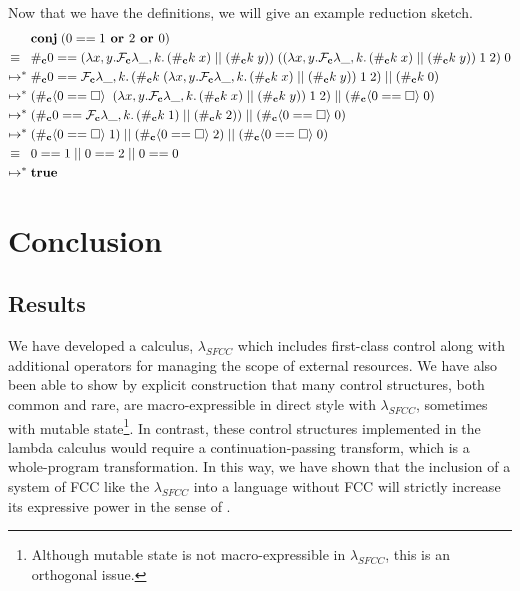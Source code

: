 \documentclass[11pt]{article}
\newcommand{\maybePage}{\newpage}
\newcommand\x{\lambda x}
\newcommand\F{\mathcal{F}}
\newcommand{\angles}[1]{\langle#1\rangle}
\begin{document}
Now that we have the definitions, we will give an example reduction sketch.
\begin{align*}
&\textbf{conj}\;(0 == 1\textbf{ or }2\textbf{ or }0) \\
\equiv{}\;\;& \#_\textbf c 0 ==
	(\x,y. \F_\textbf{c}\lambda \_, k.\,(\#_\textbf{c}k\;x)\;||\;(\#_\textbf{c}k\;y))
		\;((\x,y. \F_\textbf{c}\lambda \_, k.\,(\#_\textbf{c}k\;x)\;||\;(\#_\textbf{c}k\;y))
			\;1\;2)
		\;0 \\
%
\mapsto^*{}& \#_\textbf c 0 == \F_\textbf{c}\lambda \_, k.\,(\#_\textbf{c}k\;(\x,y. \F_\textbf{c}\lambda \_, k.\,(\#_\textbf{c}k\;x)\;||\;(\#_\textbf{c}k\;y))
			\;1\;2)\;||\;(\#_\textbf{c}k\;0)\\
%
\mapsto^*{}& (\#_\textbf{c}\angles{0==\square}\;\;(\x,y. \F_\textbf{c}\lambda \_, k.\,(\#_\textbf{c}k\;x)\;||\;(\#_\textbf{c}k\;y))
			\;1\;2)\;||\;(\#_\textbf{c}\angles{0==\square}\;0)\\
%
\mapsto^*{}& (\#_\textbf c 0==\F_\textbf{c}\lambda \_, k.\,(\#_\textbf c k\;1)\;||\;(\#_\textbf c k\;2))
			\;||\;(\#_\textbf c \angles{0==\square}\;0)\\
%
\mapsto^*{}& (\#_\textbf c \angles{0==\square}\;1)\;||\;(\#_\textbf c \angles{0==\square}\;2)\;||\;(\#_\textbf c \angles{0==\square}\;0)\\
\equiv{}\;\;& 0==1\;||\;0==2\;||\;0==0\\
%
\mapsto^*{}& \textbf{true}
\end{align*}

\maybePage
\section{Conclusion}
\label{sec:conclusion}

\subsection{Results}
We have developed a calculus, $\lambda_{SFCC}$ which includes first-class control along with additional operators for managing the scope of external resources.
We have also been able to show by explicit construction that many control structures, both common and rare, are macro-expressible in direct style with $\lambda_{SFCC}$, sometimes with mutable state\footnote{Although mutable state is not macro-expressible in $\lambda_{SFCC}$, this is an orthogonal issue.}.
In contrast, these control structures implemented in the lambda calculus would require a continuation-passing transform, which is a whole-program transformation.
In this way, we have shown that the inclusion of a system of FCC like the $\lambda_{SFCC}$ into a language without FCC will strictly increase its expressive power in the sense of \cite{Felleisen90expressive}.
\end{document}
